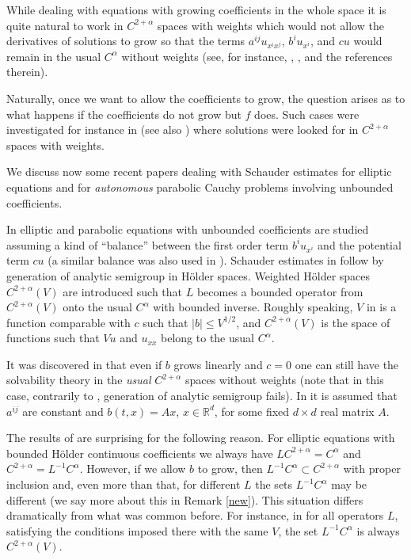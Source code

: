 \documentclass[reqno,12pt]{amsart}
\theoremstyle{definition}
\theoremstyle{remark}
\begin{document}
While dealing with equations with growing coefficients in the
whole space it is quite natural to work in $C^{2+\alpha}$ spaces
with weights which would  not allow the derivatives of solutions
    to grow   so that the
terms $a^{ij}u_{x^{i}x^{j}}$, $b^{i}u_{x^{i}}$, and $cu$ would
remain in the usual $C^{\alpha}$ without weights (see, for
instance,
    \cite{CV},
\cite{Krk}, and the references therein).

   Naturally, once we want to allow
    the  coefficients to grow, the question arises as to what
happens if the coefficients do not grow but $f$ does. Such cases
were investigated for instance
   in \cite{Lo} (see also \cite[Remark 2.2]{Kry2})
where solutions
   were looked for in $C^{2+\alpha}$ spaces with weights.

   We discuss now some recent papers dealing with Schauder estimates
   for   elliptic equations and
    for {\it autonomous} parabolic Cauchy
problems involving  unbounded
    coefficients.

In \cite{CV}  elliptic and  parabolic equations with
   unbounded coefficients are studied
   assuming a kind of
   ``balance'' between the first order
   term $b^i u_{x^i}$ and the potential term $c u$ (a similar balance
   was
   also used
   in \cite{AB}).
    Schauder estimates in \cite{CV}  follow
    by
   generation of analytic semigroup in H\"older spaces.
   Weighted H\"older spaces $C^{2+\alpha}(V)$ are introduced such
that $L$ becomes a bounded operator from $C^{2+\alpha}(V)$ onto
the usual $C^{\alpha}$ with bounded inverse. Roughly speaking, $V$
in \cite{CV} is a function comparable with $c$ such that $|b|\leq
V^{1/2}$, and $C^{2+\alpha}(V)$ is the space of functions such
that $Vu$ and $u_{xx}$ belong to the usual $C^{\alpha}$.

    It was discovered in \cite{DL}  that
   even if   $b$  grows linearly  and $c=0$ one can still have the
   solvability theory in the {\em usual\/}   $C^{2+\alpha}$ spaces
without
   weights (note that in this case, contrarily to \cite{CV},
   generation of
    analytic semigroup fails).
   In \cite{DL} it is  assumed that $a^{ij}$ are constant  and
    $b(t,x) = A x$, $x \in {\mathbb{R}}^d$, for some fixed
   $d \times d$ real  matrix $A$.

The results  of  \cite{DL}
    are surprising for the
following reason. For elliptic equations with bounded  H\"older
continuous coefficients we always have $LC^{2+\alpha}=C^{\alpha}$
and $C^{2+\alpha}=L^{-1}C^{ \alpha}$. However, if we allow $b$ to
grow, then $L^{-1}C^{ \alpha}\subset C^{2+\alpha}$ with proper
inclusion and, even more than that, for different $L$ the sets
$L^{-1}C^{ \alpha}$ may be different (we say more
about this in Remark \ref{new}).
   This situation differs dramatically from what was common before.
For instance, in \cite{CV} for all operators $L$, satisfying the
conditions imposed there with the same $V$, the set $L^{-1}C^{
\alpha}$ is always $C^{2+\alpha}(V)$.
\end{document}
